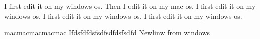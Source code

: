 I first edit it on my windows os.
Then I edit it on my mac os.
I first edit it on my windows os.
I first edit it on my windows os.
I first edit it on my windows os.

macmacmacmacmac
Ifdsfdfdsfsdfsdfdsfsdfd
Newlinw from windows

